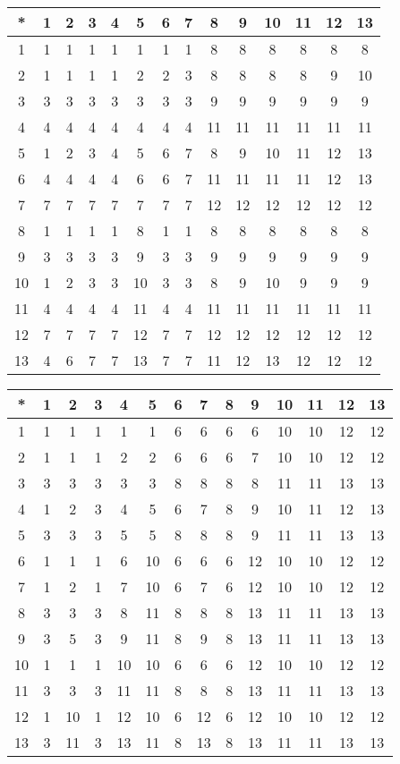 \begin{tabular}[t]{c|ccccccccccccc}
*&1&2&3&4&5&6&7&8&9&10&11&12&13 \\ \hline
    1&1&1&1&1&1&1&1&8&8&8&8&8&8 \\
    2&1&1&1&1&2&2&3&8&8&8&8&9&10 \\
    3&3&3&3&3&3&3&3&9&9&9&9&9&9 \\
    4&4&4&4&4&4&4&4&11&11&11&11&11&11 \\
    5&1&2&3&4&5&6&7&8&9&10&11&12&13 \\
    6&4&4&4&4&6&6&7&11&11&11&11&12&13 \\
    7&7&7&7&7&7&7&7&12&12&12&12&12&12 \\
    8&1&1&1&1&8&1&1&8&8&8&8&8&8 \\
    9&3&3&3&3&9&3&3&9&9&9&9&9&9 \\
    10&1&2&3&3&10&3&3&8&9&10&9&9&9 \\
    11&4&4&4&4&11&4&4&11&11&11&11&11&11 \\
    12&7&7&7&7&12&7&7&12&12&12&12&12&12 \\
    13&4&6&7&7&13&7&7&11&12&13&12&12&12 
\end{tabular}


\begin{tabular}[t]{c|ccccccccccccc}
*&1&2&3&4&5&6&7&8&9&10&11&12&13 \\ \hline
    1&1&1&1&1&1&6&6&6&6&10&10&12&12 \\
    2&1&1&1&2&2&6&6&6&7&10&10&12&12 \\
    3&3&3&3&3&3&8&8&8&8&11&11&13&13 \\
    4&1&2&3&4&5&6&7&8&9&10&11&12&13 \\
    5&3&3&3&5&5&8&8&8&9&11&11&13&13 \\
    6&1&1&1&6&10&6&6&6&12&10&10&12&12 \\
    7&1&2&1&7&10&6&7&6&12&10&10&12&12 \\
    8&3&3&3&8&11&8&8&8&13&11&11&13&13 \\
    9&3&5&3&9&11&8&9&8&13&11&11&13&13 \\
    10&1&1&1&10&10&6&6&6&12&10&10&12&12 \\
    11&3&3&3&11&11&8&8&8&13&11&11&13&13 \\
    12&1&10&1&12&10&6&12&6&12&10&10&12&12 \\
    13&3&11&3&13&11&8&13&8&13&11&11&13&13 
\end{tabular}


